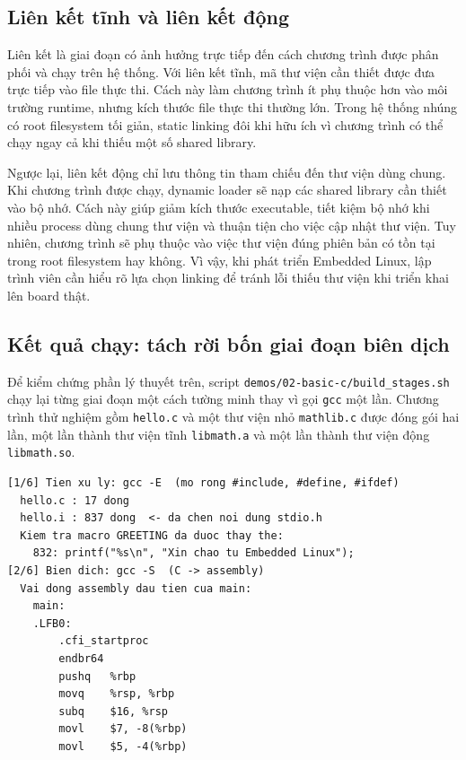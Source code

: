 \documentclass[11pt]{article}
\newcommand{\code}[1]{\texttt{#1}}
\begin{document}
\subsection{Liên kết tĩnh và liên kết động}

Liên kết là giai đoạn có ảnh hưởng trực tiếp đến cách chương trình được phân phối và chạy trên hệ thống. Với liên kết tĩnh, mã thư viện cần thiết được đưa trực tiếp vào file thực thi. Cách này làm chương trình ít phụ thuộc hơn vào môi trường runtime, nhưng kích thước file thực thi thường lớn. Trong hệ thống nhúng có root filesystem tối giản, static linking đôi khi hữu ích vì chương trình có thể chạy ngay cả khi thiếu một số shared library.

Ngược lại, liên kết động chỉ lưu thông tin tham chiếu đến thư viện dùng chung. Khi chương trình được chạy, dynamic loader sẽ nạp các shared library cần thiết vào bộ nhớ. Cách này giúp giảm kích thước executable, tiết kiệm bộ nhớ khi nhiều process dùng chung thư viện và thuận tiện cho việc cập nhật thư viện. Tuy nhiên, chương trình sẽ phụ thuộc vào việc thư viện đúng phiên bản có tồn tại trong root filesystem hay không. Vì vậy, khi phát triển Embedded Linux, lập trình viên cần hiểu rõ lựa chọn linking để tránh lỗi thiếu thư viện khi triển khai lên board thật.

\subsection{Kết quả chạy: tách rời bốn giai đoạn biên dịch}

Để kiểm chứng phần lý thuyết trên, script \code{demos/02-basic-c/build\_stages.sh} chạy lại từng giai đoạn một cách tường minh thay vì gọi \code{gcc} một lần. Chương trình thử nghiệm gồm \code{hello.c} và một thư viện nhỏ \code{mathlib.c} được đóng gói hai lần, một lần thành thư viện tĩnh \code{libmath.a} và một lần thành thư viện động \code{libmath.so}.

\begin{lstlisting}[caption={Giai đoạn tiền xử lý và biên dịch (\code{make stages})}]
[1/6] Tien xu ly: gcc -E  (mo rong #include, #define, #ifdef)
  hello.c : 17 dong
  hello.i : 837 dong  <- da chen noi dung stdio.h
  Kiem tra macro GREETING da duoc thay the:
    832: printf("%s\n", "Xin chao tu Embedded Linux");
[2/6] Bien dich: gcc -S  (C -> assembly)
  Vai dong assembly dau tien cua main:
    main:
    .LFB0:
        .cfi_startproc
        endbr64
        pushq   %rbp
        movq    %rsp, %rbp
        subq    $16, %rsp
        movl    $7, -8(%rbp)
        movl    $5, -4(%rbp)
\end{lstlisting}
\end{document}
